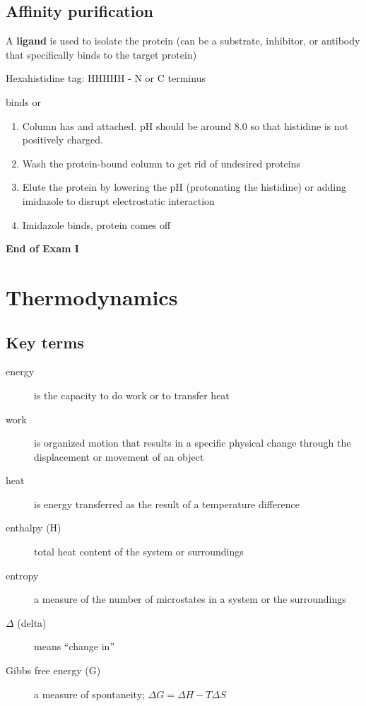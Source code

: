 \documentclass[letterpaper, 12pt]{article}
\begin{document}
\subsection*{Affinity purification}

A \textbf{ligand} is used to isolate the protein (can be a substrate, inhibitor, or antibody that specifically binds to the target protein)

Hexahistidine tag: HHHHH - N or C terminus

binds  or 

\begin{enumerate}
\item Column has  and  attached. pH should be around 8.0 so that histidine is not positively charged.
\item Wash the protein-bound column to get rid of undesired proteins
\item Elute the protein by lowering the pH (protonating the histidine) or adding imidazole to disrupt electrostatic interaction
\item Imidazole binds, protein comes off
\end{enumerate}

\vspace{5em}

\begin{center}
\large \textbf{End of Exam I}
\end{center}

\newpage

\section*{Thermodynamics}

\subsection*{Key terms}

\begin{description}
\item [energy] is the capacity to do work or to transfer heat
\item [work] is organized motion that results in a specific physical change through the displacement or movement of an object
\item [heat] is energy transferred as the result of a temperature difference
\item [enthalpy (H)] total heat content of the system or surroundings
\item [entropy] a measure of the number of microstates in a system or the surroundings
\item [$\Delta$ (delta)] means ``change in''
\item [Gibbs free energy (G)] a measure of spontaneity; $\Delta G = \Delta H - T \Delta S$
\end{description}
\end{document}
